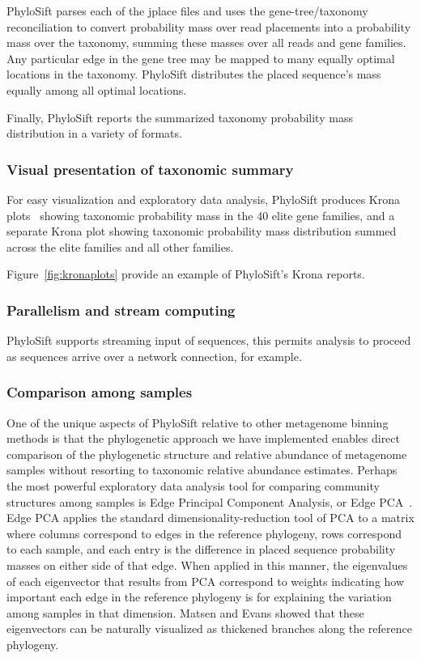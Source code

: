 \documentclass[10pt]{article}
\begin{document}
PhyloSift parses each of the jplace files and uses the gene-tree/taxonomy reconciliation to convert probability mass over read placements into a probability mass over the taxonomy, summing these masses over all reads and gene families.
Any particular edge in the gene tree may be mapped to many equally optimal locations in the taxonomy.
PhyloSift distributes the placed sequence's mass equally among all optimal locations.

Finally, PhyloSift reports the summarized taxonomy probability mass distribution in a variety of formats.

\subsubsection*{Visual presentation of taxonomic summary}

For easy visualization and exploratory data analysis, PhyloSift produces Krona plots~\cite{Ondov2011} showing taxonomic probability mass in the 40 elite gene families, and a separate Krona plot showing taxonomic probability mass distribution summed across the elite families and all other families.

Figure~\ref{fig:kronaplots} provide an example of PhyloSift's Krona reports.

\subsubsection*{Parallelism and stream computing}

PhyloSift supports streaming input of sequences, this permits analysis to proceed as sequences arrive over a network connection, for example.

\subsubsection*{Comparison among samples}

One of the unique aspects of PhyloSift relative to other metagenome binning methods is that the phylogenetic approach we have implemented enables direct comparison of the phylogenetic structure and relative abundance of metagenome samples without resorting to taxonomic relative abundance estimates.
Perhaps the most powerful exploratory data analysis tool for comparing community structures among samples is Edge Principal Component Analysis, or Edge PCA~\cite{Matsen2012}.
Edge PCA applies the standard dimensionality-reduction tool of PCA to a matrix where columns correspond to edges in the reference phylogeny, rows correspond to each sample, and each entry is the difference in placed sequence probability masses on either side of that edge.
When applied in this manner, the eigenvalues of each eigenvector that results from PCA correspond to weights indicating how important each edge in the reference phylogeny is for explaining the variation among samples in that dimension.
Matsen and Evans showed that these eigenvectors can be naturally visualized as thickened branches along the reference phylogeny.
\end{document}
